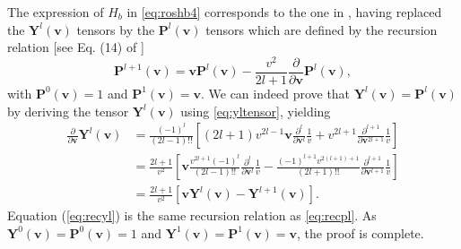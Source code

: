 The expression of $H_b$ in \cref{eq:roshb4} corresponds to the one in \citet{Ji2006}, having replaced the $\mathbf Y^l(\mathbf v)$ tensors by the $\mathbf P^l(\mathbf v)$ tensors which are defined by the recursion relation [see Eq. (14) of \citet{Ji2006}]
%
\begin{equation}
    \mathbf P^{l+1}(\mathbf v) = \mathbf v \mathbf P^{l}(\mathbf v) -\frac{v^2}{2l+1}\frac{\partial}{\partial \mathbf v}\mathbf P^{l}(\mathbf v),
\label{eq:recpl}
\end{equation}
%
with $\mathbf P^0(\mathbf v)=1$ and $\mathbf P^1(\mathbf v)=\mathbf v$.
%
We can indeed prove that $\mathbf Y^l(\mathbf v) = \mathbf P^l (\mathbf v)$ by deriving the tensor $\mathbf Y^{l}(\mathbf v)$ using \cref{eq:yltensor}, yielding
%
\begin{align}
    \frac{\partial}{\partial \mathbf v}\mathbf Y^l(\mathbf v) &= \frac{(-1)^l}{(2l-1)!!}\left[(2l+1)v^{2l-1}\mathbf v \frac{\partial^l}{\partial \mathbf v^l}\frac{1}{v}+v^{2l+1}\frac{\partial^{l+1}}{\partial \mathbf v^{2l+1}}\frac{1}{v}\right]\nonumber\\
    &=\frac{2l+1}{v^2}\left[\mathbf v \frac{v^{2l+1}(-1)^l}{(2l-1)!!}\frac{\partial^l}{\partial \mathbf v^l}\frac{1}{v}-\frac{(-1)^{l+1}v^{2(l+1)+1}}{(2l+1)!!}\frac{\partial^{l+1}}{\partial \mathbf v^{l+1}}\frac{1}{v}\right]\nonumber\\
    &=\frac{2l+1}{v^2}\left[\mathbf v \mathbf Y^l(\mathbf v)-\mathbf Y^{l+1}(\mathbf v)\right].
\label{eq:recyl}
\end{align}
%
Equation (\ref{eq:recyl}) is the same recursion relation as \cref{eq:recpl}.
%
As $\mathbf Y^{0}(\mathbf v)= \mathbf P^0(\mathbf v) = 1$ and $\mathbf Y^{1}(\mathbf v)=\mathbf P^1(\mathbf v) = \mathbf v$, the proof is complete.

